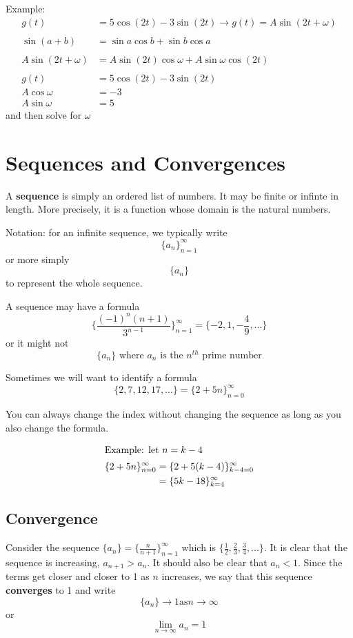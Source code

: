 \documentclass[12pt]{article}
\begin{document}
Example:
\begin{align*}
g(t) &= 5\cos(2t) - 3\sin(2t) \to g(t) = A\sin(2t+\omega)\\\\
\sin(a+b) &= \sin a\cos b + \sin b\cos a\\\\
A\sin(2t+\omega) &= A\sin(2t)\cos\omega + A\sin\omega\cos(2t)\\\\
g(t) &= 5\cos(2t) - 3\sin(2t)\\
A\cos\omega &= -3\\
A\sin\omega &= 5
\end{align*}
and then solve for $\omega$

\section*{Sequences and Convergences}
A {\bf sequence} is simply an ordered list of numbers. It may be finite or infinte in length. More precisely, it is a function whose domain is the natural numbers.

Notation: for an infinite sequence, we typically write \[ \{a_n\}_{n=1}^\infty \] or more simply \[ \{a_n\} \] to represent the whole sequence.

A sequence may have a formula \[ \{\frac{(-1)^n(n+1)}{3^{n-1}}\}_{n=1}^\infty = \{-2,1,-\frac{4}{9},...\} \] or it might not \[ \{a_n\} \text{ where $a_n$ is the $n^{th}$ prime number} \]

Sometimes we will want to identify a formula \[ \{2,7,12,17,...\} = \{2+5n\}_{n=0}^\infty \]

You can always change the index without changing the sequence as long as you also change the formula.

\begin{align*}
\intertext{Example: let $n = k-4$}
\{2+5n\}_{n=0}^\infty &= \{2+5(k-4)\}_{k-4=0}^\infty\\
&= \{5k-18\}_{k=4}^\infty
\end{align*}

\subsection*{Convergence}
Consider the sequence $\{a_n\} = \{\frac{n}{n+1}\}_{n=1}^\infty$ which is $\{\frac{1}{2},\frac{2}{3},\frac{3}{4},...\}$. It is clear that the sequence is increasing, $a_{n+1} > a_n$. It should also be clear that $a_n < 1$. Since the terms get closer and closer to 1 as $n$ increases, we say that this sequence {\bf converges} to 1 and write \[ \{a_n\}\to 1 \text{as} n\to\infty \] or \[ \displaystyle\lim_{n\to\infty}a_n = 1 \]
\end{document}
